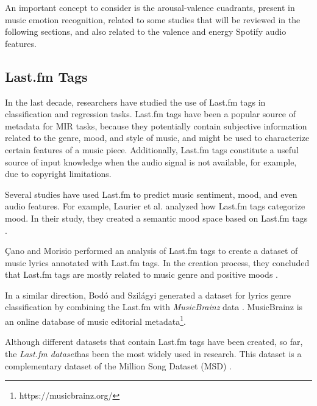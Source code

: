 \documentclass[sn-mathphys]{sn-jnl}%
\theoremstyle{thmstyleone}%
\theoremstyle{thmstyletwo}%
\theoremstyle{thmstylethree}%
\begin{document}
An important concept to consider is the arousal-valence cuadrants, present in music emotion recognition, 
related to some studies that will be reviewed in the following sections, and also related to the valence and energy
Spotify audio features.

\subsection{Last.fm Tags}

In the last decade, researchers have studied the use of Last.fm tags in classification and regression tasks.
Last.fm tags have been a popular source of metadata for MIR tasks,
because they potentially contain subjective information related to the genre, mood, and style of music,
and might be used to characterize certain features of a music piece.
Additionally, Last.fm tags constitute a useful source of input knowledge when the audio signal is not available,
for example, due to copyright limitations.


Several studies have used Last.fm to predict music sentiment, mood, and even audio features.
For example, Laurier et al. analyzed how Last.fm tags categorize mood.
In their study, they created a semantic mood space based on Last.fm tags \cite{laurier2009music}.



{\c{C}}ano and Morisio performed an analysis of Last.fm tags to create a dataset of music
lyrics annotated with Last.fm tags.
In the creation process, they concluded that Last.fm tags are mostly related to music genre
and positive moods \cite{ccano2017music}.

In a similar direction, Bod{\'o} and Szil{\'a}gyi generated a dataset for lyrics genre classification
by combining the Last.fm with \emph{MusicBrainz} data \cite{bodo2018connecting}.
MusicBrainz is an online database of music editorial metadata\footnote[1]{https://musicbrainz.org/}.

Although different datasets that contain Last.fm tags have been created, so far,
the \emph{Last.fm dataset}\footnotemark[2] has been the most widely used in research.
This dataset is a complementary dataset of the Million Song Dataset (MSD) \cite{Bertin-Mahieux2011}.
\end{document}
